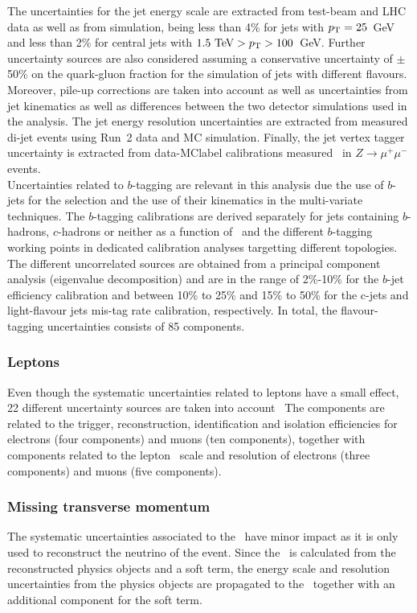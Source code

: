The uncertainties for the jet energy scale are extracted from test-beam and LHC data as well as from simulation, being less than 4\% for jets with $p_{\text{T}}=25$~GeV and less than 2\% for central jets with $1.5\text{ TeV}>p_{\text{T}}>100$~GeV. Further uncertainty sources are also considered assuming a conservative uncertainty of $\pm$50\% on the quark-gluon fraction for the simulation of jets with different flavours. Moreover, pile-up corrections are taken into account as well as uncertainties from jet kinematics as well as differences between the two detector simulations used in the analysis. The jet energy resolution uncertainties are extracted from measured di-jet events using Run~2 data and MC simulation. Finally, the jet vertex tagger uncertainty is extracted from data-\acrshort{MClabel} calibrations measured~\cite{Bothmann2016} in $Z\to\mu^+\mu^-$ events.\\

Uncertainties related to $b$-tagging are relevant in this analysis due the use of $b$-jets for the selection and the use of their kinematics in the multi-variate techniques. The $b$-tagging calibrations are derived separately for jets containing $b$-hadrons, $c$-hadrons or neither as a function of \pT\ and the different $b$-tagging working points in dedicated calibration analyses targetting different topologies. The different uncorrelated sources are obtained from a principal component analysis (eigenvalue decomposition) and are in the range of 2\%-10\% for the $b$-jet efficiency calibration and between 10\% to 25\% and
15\% to 50\% for the c-jets and light-flavour jets mis-tag rate calibration, respectively. In total, the flavour-tagging uncertainties consists of 85 components.\\

\subsubsection{Leptons}
Even though the systematic uncertainties related to leptons have a small effect, 22 different uncertainty sources are taken into account~\cite{Aad_2019,Aad_2016}
The components are related to the trigger, reconstruction, identification and isolation efficiencies for electrons (four components) and muons (ten components), together with components related to the lepton \pT\ scale and resolution of electrons (three components) and muons (five components).

\subsubsection{Missing transverse momentum}
The systematic uncertainties associated to the \MET\ have minor impact as it is only used to reconstruct the neutrino of the event. Since the \MET\ is calculated from the reconstructed physics objects and a soft term, the energy scale and resolution uncertainties from the physics objects are propagated to the \MET\ together with an additional component for the soft term. 


